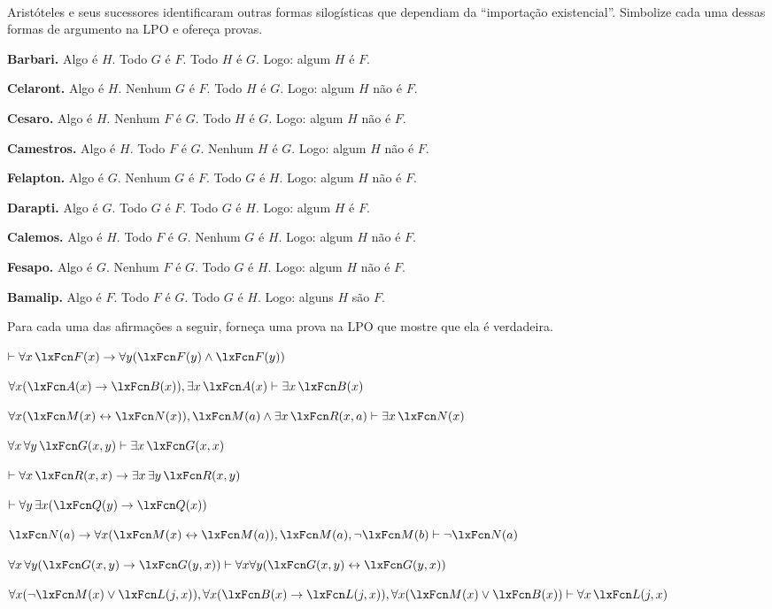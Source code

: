 \

\problempart
\label{pr.BarbaraEtc.proof2}
Aristóteles e seus sucessores identificaram outras formas silogísticas que dependiam da \textquotedblleft importação existencial\textquotedblright{}. Simbolize cada uma dessas formas de argumento na LPO e ofereça provas.
\begin{compactlist}
\item \textbf{Barbari.} Algo é $H$. Todo $G$ é $F$. Todo $H$ é $G$. Logo: algum $H$ é $F$.
\item \textbf{Celaront.} Algo é $H$. Nenhum $G$ é $F$. Todo $H$ é $G$. Logo: algum $H$ não é $F$.
\item \textbf{Cesaro.} Algo é $H$. Nenhum $F$ é $G$. Todo $H$ é $G$. Logo: algum $H$ não é $F$.
\item \textbf{Camestros.} Algo é $H$. Todo $F$ é $G$. Nenhum $H$ é $G$. Logo: algum $H$ não é $F$.
\item \textbf{Felapton.} Algo é $G$. Nenhum $G$ é $F$. Todo $G$ é $H$. Logo: algum $H$ não é $F$.
\item \textbf{Darapti.} Algo é $G$. Todo $G$ é $F$. Todo $G$ é $H$. Logo: algum $H$ é $F$.
\item \textbf{Calemos.} Algo é $H$. Todo $F$ é $G$. Nenhum $G$ é $H$. Logo: algum $H$ não é $F$.
\item \textbf{Fesapo.} Algo é $G$. Nenhum $F$ é $G$. Todo $G$ é $H$. Logo: algum $H$ não é $F$.
\item \textbf{Bamalip.} Algo é $F$. Todo $F$ é $G$. Todo $G$ é $H$. Logo: alguns $H$ são $F$.
\end{compactlist}

\problempart
\label{pr.someFOLproofs}
Para cada uma das afirmações a seguir, forneça uma prova na LPO que mostre
que ela é verdadeira.
\begin{compactlist}
\item $\proves \forall x\,\atom{F}{x} \eif \forall y(\atom{F}{y} \eand \atom{F}{y})$
\item $\forall x(\atom{A}{x}\eif \atom{B}{x}), \exists x\,\atom{A}{x} \proves \exists x\,\atom{B}{x}$
\item $\forall x(\atom{M}{x} \eiff \atom{N}{x}), \atom{M}{a} \eand \exists x\,\atom{R}{x,a} \proves \exists x\,\atom{N}{x}$
\item $\forall x\, \forall y\,\atom{G}{x,y}\proves\exists x\,\atom{G}{x,x}$
\item $\proves\forall x\,\atom{R}{x,x} \eif \exists x\, \exists y\,\atom{R}{x,y}$
\item $\proves\forall y\, \exists x (\atom{Q}{y} \eif \atom{Q}{x})$
\item $\atom{N}{a} \eif \forall x(\atom{M}{x} \eiff \atom{M}{a}), \atom{M}{a}, \enot\atom{M}{b}\proves \enot \atom{N}{a}$
\item $\forall x\, \forall y (\atom{G}{x,y} \eif \atom{G}{y,x}) \proves \forall x\forall y (\atom{G}{x,y} \eiff \atom{G}{y,x})$
\item $\forall x(\enot\atom{M}{x} \eor \atom{L}{j,x}), \forall x(\atom{B}{x}\eif \atom{L}{j,x}), \forall x(\atom{M}{x}\eor \atom{B}{x})\proves \forall x\,\atom{L}{j,x}$
\end{compactlist}

